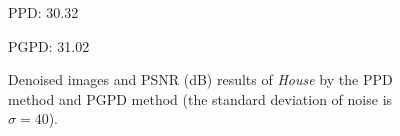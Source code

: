 \begin{figure}[ht!]
{\begin{minipage}[t]{0.24\textwidth}
{\footnotesize PPD: 30.32}
\end{minipage}
\begin{minipage}[t]{0.24\textwidth}
\centering
{}
{\footnotesize PGPD: 31.02}
\end{minipage}
}\vspace{-3mm}
    \caption{Denoised images and PSNR (dB) results of \textsl{House} by the PPD method and PGPD method (the standard deviation of noise is $\sigma=40$).}
    \label{fig2-7}
\end{figure}


